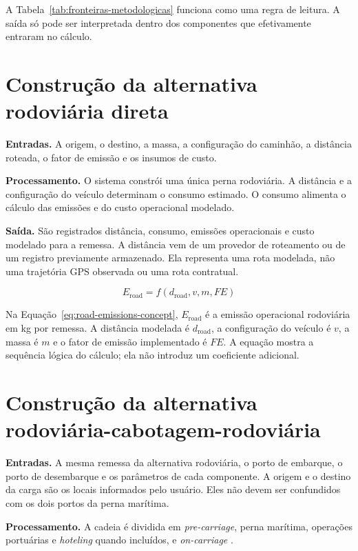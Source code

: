 A Tabela~\ref{tab:fronteiras-metodologicas} funciona como uma regra de leitura. A saída só pode ser interpretada dentro dos componentes que efetivamente entraram no cálculo.

\section{Construção da alternativa rodoviária direta}
\label{sec:metodologia-rodovia}

\textbf{Entradas.} A origem, o destino, a massa, a configuração do caminhão, a distância roteada, o fator de emissão e os insumos de custo.

\textbf{Processamento.} O sistema constrói uma única perna rodoviária. A distância e a configuração do veículo determinam o consumo estimado. O consumo alimenta o cálculo das emissões e do custo operacional modelado.

\textbf{Saída.} São registrados distância, consumo, emissões operacionais e custo modelado para a remessa. A distância vem de um provedor de roteamento ou de um registro previamente armazenado. Ela representa uma rota modelada, não uma trajetória GPS observada ou uma rota contratual.

\begin{equation}
E_{\mathrm{road}} = f(d_{\mathrm{road}}, v, m, FE)
\label{eq:road-emissions-concept}
\end{equation}

Na Equação~\ref{eq:road-emissions-concept}, \(E_{\mathrm{road}}\) é a emissão operacional rodoviária em kg \cooe{} por remessa. A distância modelada é \(d_{\mathrm{road}}\), a configuração do veículo é \(v\), a massa é \(m\) e o fator de emissão implementado é \(FE\). A equação mostra a sequência lógica do cálculo; ela não introduz um coeficiente adicional.

\section{Construção da alternativa rodoviária-cabotagem-rodoviária}
\label{sec:metodologia-multimodal}

\textbf{Entradas.} A mesma remessa da alternativa rodoviária, o porto de embarque, o porto de desembarque e os parâmetros de cada componente. A origem e o destino da carga são os locais informados pelo usuário. Eles não devem ser confundidos com os dois portos da perna marítima.

\textbf{Processamento.} A cadeia é dividida em \emph{pre-carriage}, perna marítima, operações portuárias e \emph{hoteling} quando incluídos, e \emph{on-carriage} \cite{shortsea2019,competitiveness2024}.

